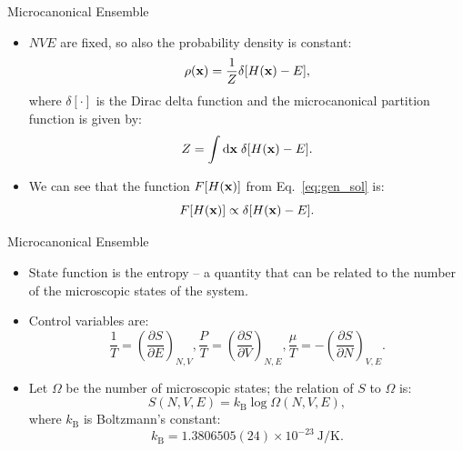\documentclass[10pt]{beamer}
\begin{document}
\begin{frame}{Microcanonical Ensemble}
\begin{itemize}
\setlength\itemsep{1em}
  \item $NVE$ are fixed, so also the probability density is constant:
  \begin{equation}
    \rho({\bf x}) = \frac{1}{Z} \delta[H({\bf x}) - E],
  \end{equation}
  where $\delta[\cdot]$ is the Dirac delta function and the microcanonical partition function is given by:
  \begin{equation}
    Z = \int \mathrm{d}{\bf x}\; \delta[H({\bf x}) - E].
  \end{equation}

  \item We can see that the function $F[H({\bf x})]$ from Eq.~\ref{eq:gen_sol} is:
  \begin{equation}
    F[H({\bf x})] \propto \delta[H({\bf x}) - E].
  \end{equation}
\end{itemize}
\end{frame}

\begin{frame}{Microcanonical Ensemble}
\begin{itemize}
\setlength\itemsep{1em}
  \item State function is the entropy -- a quantity that can be related to the number of the microscopic states of the system.

  \item Control variables are:
  \begin{equation}
  \textstyle
    \frac{1}{T}=\left( \frac{\partial{S}}{\partial{E}} \right)_{N, V},
    \frac{P}{T}=\left( \frac{\partial{S}}{\partial{V}} \right)_{N, E},
    \frac{\mu}{T}=-\left( \frac{\partial{S}}{\partial{N}} \right)_{V, E}.
  \end{equation}

  \item Let $\Omega$ be the number of microscopic states; the relation of $S$ to $\Omega$ is:
  \begin{equation}
    S(N, V, E) = k_{\mathrm{B}} \log \Omega(N, V, E),
  \end{equation}
  where $k_{\mathrm{B}}$ is Boltzmann's constant:
  \begin{equation}
    k_{\mathrm{B}}=1.3806505(24)\times 10^{-23}~\mathrm{J/K}.
  \end{equation}
\end{itemize}
\end{frame}
\end{document}
